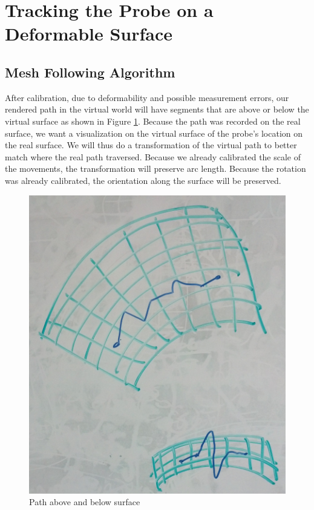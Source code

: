 \section{Tracking the Probe on a Deformable Surface}

\subsection{Mesh Following Algorithm}

After calibration, due to deformability and possible measurement errors, our rendered path in the virtual world will have segments that are above or below the virtual surface as shown in Figure \ref{pathsAboveAndBelow}. Because the path was recorded on the real surface, we want a visualization on the virtual surface of the probe's location on the real surface. We will thus do a transformation of the virtual path to better match where the real path traversed. Because we already calibrated the scale of the movements, the transformation will preserve arc length. Because the rotation was already calibrated, the orientation along the surface will be preserved.

\begin{figure}[ht]
\centering
\includegraphics[width=\columnwidth]{pathaboveandbelow.jpg}
\caption{Path above and below surface}
\label{pathsAboveAndBelow}
\end{figure}

